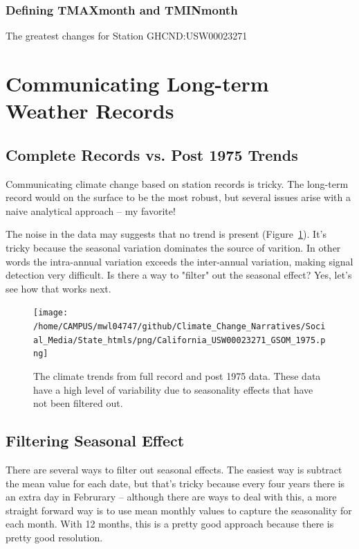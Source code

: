 \documentclass{article}\usepackage[]{graphicx}\usepackage[]{color}
\begin{document}
\subsubsection{Defining TMAXmonth and TMINmonth}


The greatest changes for Station GHCND:USW00023271

\section{Communicating Long-term Weather Records}

\subsection{Complete Records vs. Post 1975 Trends}

Communicating climate change based on station records is tricky. The long-term record would on the surface to be the most robust, but several issues arise with a naive analytical approach -- my favorite!



The noise in the data may suggests that no trend is present (Figure~\ref{fig:GSOM-1975trend}). It's tricky because the seasonal variation dominates the source of varition. In other words the intra-annual variation exceeds the inter-annual variation, making signal detection very difficult. Is there a way to "filter" out the seasonal effect? Yes, let's see how that works next. 

\begin{figure}
\texttt{[image: /home/CAMPUS/mwl04747/github/Climate\_Change\_Narratives/Social\_Media/State\_htmls/png/California\_USW00023271\_GSOM\_1975.png]}
\caption{The climate trends from full record and post 1975 data. These data have a high level of variability due to seasonality effects that have not been filtered out.}
\label{fig:GSOM-1975trend}
\end{figure}


\subsection{Filtering Seasonal Effect}

There are several ways to filter out seasonal effects. The easiest way is subtract the mean value for each date, but that's tricky because every four years there is an extra day in Februrary -- although there are ways to deal with this, a more straight forward way is to use mean monthly values to capture the seasonality for each month. With 12 months, this is a pretty good approach because there is pretty good resolution. 
\end{document}
